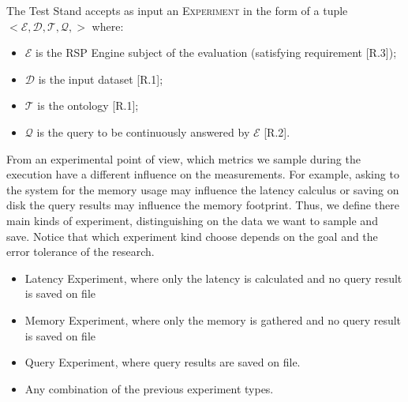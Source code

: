 \noindent The Test Stand accepts as input an \textsc{Experiment} in the form of a tuple \\ $<\mathcal{E},\mathcal{D},\mathcal{T},\mathcal{Q},>$ where:
\begin{itemize}
\item $\mathcal{E}$ is the RSP Engine subject of the evaluation (satisfying requirement [R.3]); 
\item $\mathcal{D}$ is the input dataset [R.1]; 
\item $\mathcal{T}$ is the ontology [R.1]; 
\item $\mathcal{Q}$ is the query to be continuously answered by $\mathcal{E}$ [R.2]. 
\end{itemize}

From an experimental point of view, which metrics we sample during the execution have a different influence on the measurements. For example, asking to the system for the memory usage may influence the latency calculus or saving on disk the query results may influence the memory footprint. Thus, we define there main kinds of experiment, distinguishing on the data we want to sample and save. Notice that which experiment kind choose depends on the goal and the error tolerance of the research.

\begin{itemize}
\item Latency Experiment, where only the latency is calculated and no query result is saved on file
\item Memory Experiment, where only the memory is gathered and no query result is saved on file
\item Query Experiment, where query results are saved on file.
\item Any combination of the previous experiment types.
\end{itemize}


